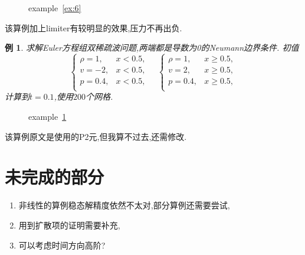 \documentclass[a4paper, 11pt]{ctexart}
\numberwithin{equation}{section}
\numberwithin{figure}{section}
\newtheorem{example}{例}
\begin{document}
\begin{figure}[H]
  \centering
\caption{example~\ref{ex:6}}
\end{figure}
该算例加上limiter有较明显的效果,压力不再出负.

\begin{example}\label{ex:7}
  求解Euler方程组双稀疏波问题,两端都是导数为0的Neumann边界条件.
  初值
  \begin{equation}
    \begin{cases}
      \rho=1, & x<0.5,\\
      v=-2, & x<0.5,\\
      p=0.4, & x<0.5,\\
    \end{cases}\quad
    \begin{cases}
      \rho=1, & x\geqslant0.5,\\
      v=2, & x\geqslant0.5,\\
      p=0.4, & x\geqslant0.5,\\
    \end{cases}
  \end{equation}
  计算到$t=0.1$,使用$200$个网格.
\end{example}

\begin{figure}[H]
  \centering
\caption{example~\ref{ex:7}}
\end{figure}

该算例原文是使用的P2元,但我算不过去,还需修改.


\section{未完成的部分}
\begin{enumerate}
  \item 非线性的算例稳态解精度依然不太对,部分算例还需要尝试,
  \item 用到扩散项的证明需要补充,
  \item 可以考虑时间方向高阶?
\end{enumerate}
\end{document}
